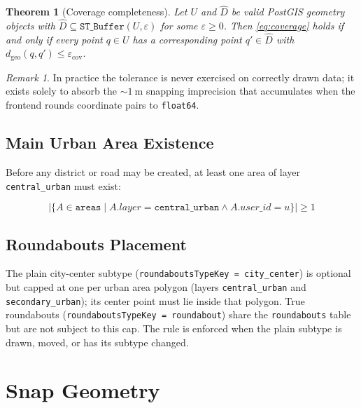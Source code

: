 \documentclass[12pt,a4paper]{article}
\theoremstyle{definition}
\theoremstyle{plain}
\newtheorem{theorem}{Theorem}[section]
\theoremstyle{remark}
\newtheorem{remark}{Remark}[section]
\newcommand{\abs}[1]{\left\lvert #1 \right\rvert}
\begin{document}
\begin{theorem}[Coverage completeness]
Let $U$ and $\hat{D}$ be valid PostGIS geometry objects with
$\hat{D} \subseteq \texttt{ST\_Buffer}(U, \varepsilon)$ for some
$\varepsilon \geq 0$. Then \cref{eq:coverage} holds if and only if every
point $q \in U$ has a corresponding point $q' \in \hat{D}$ with
$d_{\text{geo}}(q, q') \leq \varepsilon_{\text{cov}}$.
\end{theorem}

\begin{remark}
In practice the tolerance is never exercised on correctly drawn data; it
exists solely to absorb the ${\sim}1\ \mathrm{m}$ snapping imprecision
that accumulates when the frontend rounds coordinate pairs to \texttt{float64}.
\end{remark}

\subsection{Main Urban Area Existence}
\label{sec:urban_exists}

Before any district or road may be created, at least one area of layer
\texttt{central\_urban} must exist:

\begin{equation}
  \abs{\{
    A \in \texttt{areas} \mid
    A.\mathit{layer} = \texttt{central\_urban} \land
    A.\mathit{user\_id} = u
  \}} \geq 1
  \label{eq:urban_exists}
\end{equation}

\subsection{Roundabouts Placement}
\label{sec:roundabouts_placement}

The plain city-center subtype (\texttt{roundaboutsTypeKey = city\_center}) is optional but capped at one
per urban area polygon (layers \texttt{central\_urban} and
\texttt{secondary\_urban}); its center point must lie inside that polygon.
True roundabouts (\texttt{roundaboutsTypeKey = roundabout}) share the \texttt{roundabouts} table but are
not subject to this cap. The rule is enforced when the plain subtype is drawn,
moved, or has its subtype changed.

\section{Snap Geometry}
\label{sec:snap}
\end{document}
